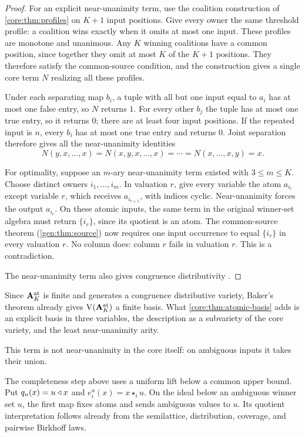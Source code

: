 \begin{proof}
For an explicit near-unanimity term, use the coalition construction of
\cref{core:thm:profiles} on $K+1$ input positions. Give every owner the
same threshold profile: a coalition wins exactly when it omits at most
one input. These profiles are monotone and unanimous. Any $K$ winning
coalitions have a common position, since together they omit at most
$K$ of the $K+1$ positions. They therefore satisfy the common-source
condition, and the construction gives a single core term $N$ realizing
all these profiles.

Under each separating map $b_i$, a tuple with all but one input equal
to $a_i$ has at most one false entry, so $N$ returns $1$. For every
other $b_j$ the tuple has at most one true entry, so it returns $0$;
there are at least four input positions. If the repeated input is $n$,
every $b_i$ has at most one true entry and returns $0$. Joint separation
therefore gives all the near-unanimity identities
\[
 N(y,x,\ldots,x)=N(x,y,x,\ldots,x)=\cdots
   =N(x,\ldots,x,y)=x.
\]

For optimality, suppose an $m$-ary near-unanimity term existed with
$3\leq m\leq K$. Choose distinct owners $i_1,\ldots,i_m$.
In valuation $r$, give every variable the atom $a_{i_r}$ except
variable $r$, which receives $a_{i_{r+1}}$, with indices cyclic.
Near-unanimity forces the output $a_{i_r}$. On these atomic inputs,
the same term in the original winner-set algebra must return
$\{i_r\}$, since its quotient is an atom. The common-source theorem
(\cref{gen:thm:source}) now requires one input occurrence to equal
$\{i_r\}$ in every valuation $r$. No column does: column $r$
fails in valuation $r$. This is a contradiction.

The near-unanimity term also gives congruence distributivity
\cite{Mitschke1978}.
\end{proof}

Since $\mathbf A_K^{\rm at}$ is finite and generates a congruence
distributive variety, Baker's theorem \cite{Baker1977} already gives
$\operatorname V(\mathbf A_K^{\rm at})$ a finite basis. What
\cref{core:thm:atomic-basis} adds is an explicit basis in three
variables, the description as a subvariety of the core variety, and the
least near-unanimity arity.

This term is not near-unanimity in the core itself: on ambiguous
inputs it takes their union.

The completeness step above uses a uniform lift below a common upper bound. Put
$q_u(x)=u\mathbin{\triangleleft} x$ and $e_i^u(x)=x\star_i u$. On the ideal below an
ambiguous winner set $u$, the first map fixes atoms and sends ambiguous
values to $u$. Its quotient interpretation follows already from the
semilattice, distribution, coverage, and pairwise Birkhoff laws.

